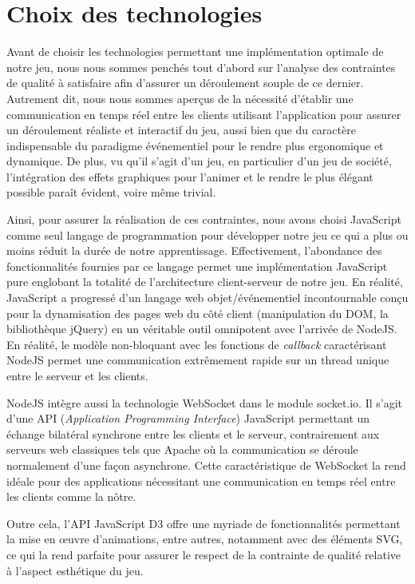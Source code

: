 \documentclass[12pt]{report}
\begin{document}
  \section{Choix des technologies}
	Avant de choisir les technologies permettant une implémentation optimale de notre jeu, nous nous sommes penchés tout d'abord sur l'analyse des contraintes de qualité à satisfaire afin d'assurer un déroulement souple de ce dernier. Autrement dit, nous nous sommes aperçus de la nécessité d'établir une communication en temps réel entre les clients utilisant l'application pour assurer un déroulement réaliste et interactif du jeu, aussi bien que du caractère indispensable du paradigme événementiel pour le rendre plus ergonomique et dynamique. De plus, vu qu'il s'agit d'un jeu, en particulier d'un jeu de société, l'intégration des effets graphiques pour l'animer et le rendre le plus élégant possible paraît évident, voire même trivial.

	Ainsi, pour assurer la réalisation de ces contraintes, nous avons choisi JavaScript comme seul langage de programmation pour développer notre jeu ce qui a plus ou moins réduit la durée de notre apprentissage. Effectivement, l'abondance des fonctionnalités fournies par ce langage permet une implémentation JavaScript pure englobant la totalité de l'architecture client-serveur de notre jeu. En réalité, JavaScript a progressé d'un langage web objet/événementiel incontournable conçu pour la dynamisation des pages web du côté client (manipulation du DOM, la bibliothèque jQuery) en un véritable outil omnipotent avec l'arrivée de NodeJS. En réalité, le modèle non-bloquant avec les fonctions de \textit{callback} caractérisant NodeJS permet une communication extrêmement rapide sur un thread unique entre le serveur et les clients.

	NodeJS intègre aussi la technologie WebSocket dans le module socket.io. Il s'agit d'une API (\textit{Application Programming Interface}) JavaScript permettant un échange bilatéral synchrone entre les clients et le serveur, contrairement aux serveurs web classiques tels que Apache où la communication se déroule normalement d'une façon asynchrone. Cette caractéristique de WebSocket la rend idéale pour des applications nécessitant une communication en temps réel entre les clients comme la nôtre.

	Outre cela, l'API JavaScript D3 offre une myriade de fonctionnalités permettant la mise en \oe{}uvre d'animations, entre autres, notamment avec des éléments SVG, ce qui la rend parfaite pour assurer le respect de la contrainte de qualité relative à l'aspect esthétique du jeu.
\end{document}
